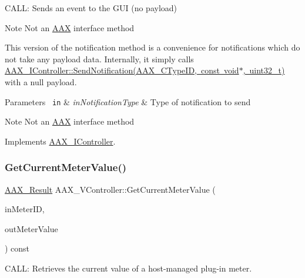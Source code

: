 C\+A\+LL\+: Sends an event to the G\+UI (no payload) \begin{DoxyNote}{Note}
Not an \mbox{\hyperlink{a00852}{A\+AX}} interface method 
\end{DoxyNote}


This version of the notification method is a convenience for notifications which do not take any payload data. Internally, it simply calls \mbox{\hyperlink{a01789_a0384f820cecf8cf7671057060bf5ba4f}{A\+A\+X\+\_\+\+I\+Controller\+::\+Send\+Notification(\+A\+A\+X\+\_\+\+C\+Type\+I\+D, const void$\ast$, uint32\+\_\+t)}} with a null payload.


\begin{DoxyParams}[1]{Parameters}
\mbox{\texttt{ in}}  & {\em in\+Notification\+Type} & Type of notification to send \\
\hline
\end{DoxyParams}
\begin{DoxyNote}{Note}
Not an \mbox{\hyperlink{a00852}{A\+AX}} interface method 
\end{DoxyNote}


Implements \mbox{\hyperlink{a01789_ad98d549cc7bec4039ce174438d46d5db}{A\+A\+X\+\_\+\+I\+Controller}}.

\mbox{\label{a01905_adc873027ab5a8431a96a39497a1f0f0f}} 
\subsubsection{\texorpdfstring{GetCurrentMeterValue()}{GetCurrentMeterValue()}}
{\footnotesize\ttfamily \mbox{\hyperlink{a00392_a4d8f69a697df7f70c3a8e9b8ee130d2f}{A\+A\+X\+\_\+\+Result}} A\+A\+X\+\_\+\+V\+Controller\+::\+Get\+Current\+Meter\+Value (\begin{DoxyParamCaption}\item[{\mbox{\hyperlink{a00392_ac678f9c1fbcc26315d209f71a147a175}{A\+A\+X\+\_\+\+C\+Type\+ID}}}]{in\+Meter\+ID,  }\item[{float $\ast$}]{out\+Meter\+Value }\end{DoxyParamCaption}) const\hspace{0.3cm}{\ttfamily [virtual]}}



C\+A\+LL\+: Retrieves the current value of a host-\/managed plug-\/in meter. 


